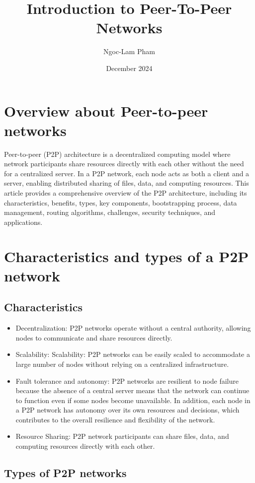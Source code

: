 \documentclass{article}
\title{Introduction to Peer-To-Peer Networks}
\author{Ngoc-Lam Pham}
\date{December 2024}
\begin{document}
\maketitle

\section{Overview about Peer-to-peer networks}
Peer-to-peer (P2P) architecture is a decentralized computing model where network participants share resources directly with each other without the need for a centralized server. In a P2P network, each node acts as both a client and a server, enabling distributed sharing of files, data, and computing resources. This article provides a comprehensive overview of the P2P architecture, including its characteristics, benefits, types, key components, bootstrapping process, data management, routing algorithms, challenges, security techniques, and applications.

\section{Characteristics and types of a P2P network}
\subsection{Characteristics}
\begin{itemize}
    \item Decentralization: P2P networks operate without a central authority, allowing nodes to communicate and share resources directly.
    \item Scalability: Scalability: P2P networks can be easily scaled to accommodate a large number of nodes without relying on a centralized infrastructure.
    \item Fault tolerance and autonomy: P2P networks are resilient to node failure because the absence of a central server means that the network can continue to function even if some nodes become unavailable. In addition, each node in a P2P network has autonomy over its own resources and decisions, which contributes to the overall resilience and flexibility of the network.
    \item Resource Sharing: P2P network participants can share files, data, and computing resources directly with each other.
\end{itemize}

\subsection{Types of P2P networks}
\end{document}
